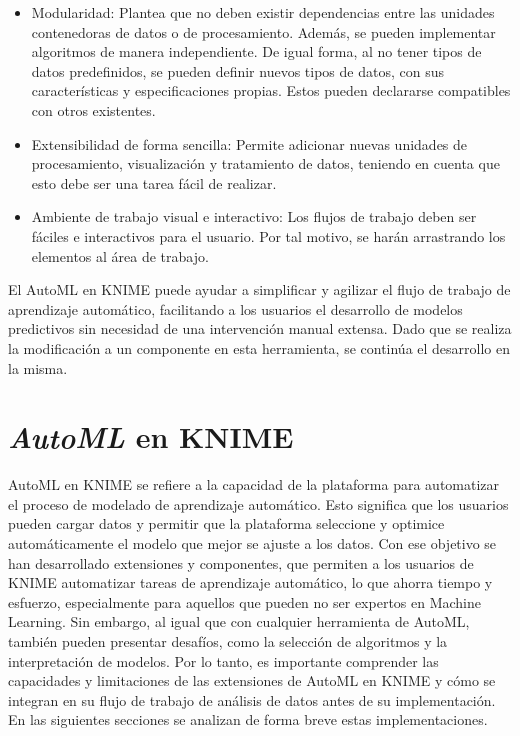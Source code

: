 \begin{itemize}
	\item Modularidad: Plantea que no deben existir dependencias entre las unidades contenedoras de datos o de procesamiento. Además, se pueden implementar algoritmos de manera independiente. De igual forma, al no tener tipos de datos predefinidos, se pueden definir nuevos tipos de datos, con sus características y especificaciones propias. Estos pueden declararse compatibles con otros existentes.
	\item	Extensibilidad de forma sencilla: Permite adicionar nuevas unidades de procesamiento, visualización y tratamiento de datos, teniendo en cuenta que esto debe ser una tarea fácil de realizar.
	\item	Ambiente de trabajo visual e interactivo: Los flujos de trabajo deben ser fáciles e interactivos para el usuario. Por tal motivo, se harán arrastrando los elementos al área de trabajo.
\end{itemize}

El AutoML en KNIME puede ayudar a simplificar y agilizar el flujo de trabajo de aprendizaje automático, facilitando a los usuarios el desarrollo de modelos predictivos sin necesidad de una intervención manual extensa. Dado que se realiza la modificación a un componente en esta herramienta, se continúa el desarrollo en la misma.

\section{\textit{AutoML} en KNIME}
AutoML en KNIME se refiere a la capacidad de la plataforma para automatizar el proceso de modelado de aprendizaje automático. Esto significa que los usuarios pueden cargar datos y permitir que la plataforma seleccione y optimice automáticamente el modelo que mejor se ajuste a los datos. Con ese objetivo se han desarrollado extensiones y componentes, que permiten a los usuarios de KNIME automatizar tareas de aprendizaje automático, lo que ahorra tiempo y esfuerzo, especialmente para aquellos que pueden no ser expertos en Machine Learning. Sin embargo, al igual que con cualquier herramienta de AutoML, también pueden presentar desafíos, como la selección de algoritmos y la interpretación de modelos. Por lo tanto, es importante comprender las capacidades y limitaciones de las extensiones de AutoML en KNIME y cómo se integran en su flujo de trabajo de análisis de datos antes de su implementación. En las siguientes secciones se analizan de forma breve estas implementaciones.

